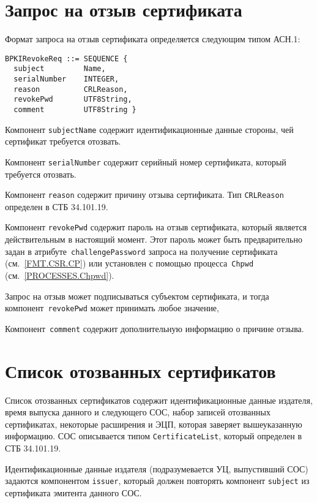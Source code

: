 \section{Запрос на отзыв сертификата}\label{FMT.BPKIRevokeReq}

Формат запроса на отзыв сертификата определяется следующим типом АСН.1:
\begin{verbatim}
BPKIRevokeReq ::= SEQUENCE {
  subject         Name,
  serialNumber    INTEGER,
  reason          CRLReason,
  revokePwd       UTF8String,
  comment         UTF8String }
\end{verbatim}

Компонент \texttt{subjectName} содержит идентификационные 
данные стороны, чей сертификат требуется отозвать. 

Компонент \texttt{serialNumber} содержит серийный номер 
сертификата, который требуется отозвать.

Компонент \texttt{reason} содержит причину отзыва сертификата. 
Тип \texttt{CRLReason} определен в СТБ 34.101.19.

Компонент \texttt{revokePwd} содержит пароль на отзыв 
сертификата, который является действительным в 
настоящий момент. Этот пароль может быть предварительно
задан в атрибуте~\texttt{challengePassword} запроса на получение 
сертификата (см.~\ref{FMT.CSR.CP}) или установлен с помощью 
процесса~\texttt{Chpwd} (см.~\ref{PROCESSES.Chpwd}).

Запрос на отзыв может подписываться субъектом сертификата,
и тогда компонент~\texttt{revokePwd} может принимать любое значение,

Компонент~\texttt{comment} содержит дополнительную информацию 
о причине отзыва.
 
\section{Список отозванных сертификатов}\label{FMT.CRL}

Список отозванных сертификатов содержит идентификационные данные 
издателя, время выпуска данного и следующего СОС, набор 
записей отозванных сертификатах, некоторые расширения и ЭЦП, 
которая заверяет вышеуказанную информацию. СОС описывается типом 
\texttt{CertificateList}, который определен в СТБ 34.101.19.
 
Идентификационные данные издателя (подразумевается УЦ, 
выпустивший СОС) задаются компонентом \texttt{issuer}, 
который должен повторять компонент \texttt{subject} из 
сертификата эмитента данного СОС.  

